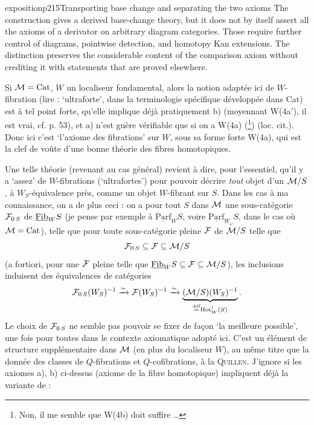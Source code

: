 \begin{dcomment}{exposition}{p215}{Transporting base change and separating the two axioms}
The construction gives a derived base-change theory, but it does not by itself assert all the axioms of a derivator on arbitrary diagram categories. Those require further control of diagrams, pointwise detection, and homotopy Kan extensions. The distinction preserves the considerable content of the comparison axiom without crediting it with statements that are proved elsewhere.
\end{dcomment}


Si $\mathcal{M} = \mathrm{Cat}$, $W$ un localiseur fondamental, alors la notion adaptée ici de $W$-fibration (lire : ‘ultraforte’, dans la terminologie spécifique développée dans Cat) est à tel point forte, qu'elle implique déjà pratiquement b) (moyennant W(4a$'$), il est vrai, cf. p. 53), et
a) n'est guère vérifiable que si on a W(4a) (\footnote[122]{Non, il me semble que W(4b) doit suffire \dots}) (loc. cit.). Donc ici c'est ‘l'axiome des fibrations’ sur $W$, sous sa forme forte W(4a), qui est la clef de voûte d'une bonne théorie des fibres homotopiques.

Une telle théorie (revenant au cas général) revient à dire, pour l'essentiel, qu'il y a ‘assez’ de $W$-fibrations (‘ultrafortes’) pour pouvoir décrire \textit{tout} objet d'un $\mathcal{M}/S$, à $W_S$-équivalence près, comme un objet $W$-fibrant sur $S$. Dans les cas à ma connaissance, on a de plus ceci : on  a pour tout $S$ dans $\mathcal{M}$ une sous-catégorie $\mathcal{F}_{0\,S}$ de $\underline{\mathrm{Fib}}_W S$ (je pense par exemple à $\underline{\mathrm{Parf}}_W S$, voire $\underline{\mathrm{Parf}}_{W_\omega} S$, dans le cas où $\mathcal{M} = \mathrm{Cat}$), telle que pour toute sous-catégorie pleine $\mathcal{F}$ de $\mathcal{M}/S$ telle que
\[
\mathcal{F}_{0\,S} \subseteq \mathcal{F} \subseteq \mathcal{M}/S
\]
(a fortiori, pour une $\mathcal{F}$ pleine telle que $\underline{\mathrm{Fib}}_W S \subseteq \mathcal{F} \subseteq \mathcal{M}/S$), les inclusions induisent des équivalences de catégories
\[
\cF_{0\,S}(W_S)^{-1} \xrightarrow{\sim} \cF(W_S)^{-1} \xrightarrow{\sim} \underbrace{(\cM/S)(W_S)^{-1}}_{\overset{\text{déf}}{=} \mathrm{Hot}^!_W(S)}. %
\]
Le choix de $\mathcal{F}_{0\,S}$ ne semble pas pouvoir se fixer de façon ‘la meilleure possible’, une fois pour toutes dans le contexte axiomatique adopté ici. C'est un élément de structure supplémentaire dans $\mathcal{M}$ (en plus du localiseur $W$), au même titre que la donnée des classes de $Q$-fibrations et $Q$-cofibrations, à la \textsc{Quillen}. J'ignore si les axiomes a), b) ci-dessus (axiome de la fibre homotopique) impliquent déjà  la variante de  :

